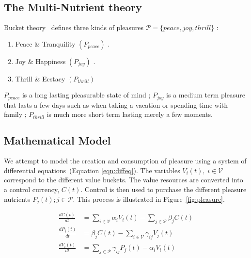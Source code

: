 \documentclass{article}
\begin{document}
\subsection{The Multi-Nutrient theory}
Bucket theory~\cite{bucket2014} defines three kinds of pleasures $ \mathcal{P} = \{peace, joy, thrill \}$ : 
\begin{enumerate}
\item Peace \& Tranquility $(P_{peace})$ .
\item Joy \& Happiness  $(P_{joy})$ .
\item Thrill \& Ecstacy $(P_{thrill})$
\end{enumerate}

$P_{peace}$ is a long lasting pleasurable state of mind ; $P_{joy}$ is a medium term pleasure that lasts a few days such as when taking a vacation or spending time with family ;  $P_{thrill}$ is much more short term lasting merely a few moments. 


\subsection{Mathematical Model}
We attempt to model the creation and consumption of pleasure using a system of differential equations~(Equation \ref{eqn:diffeq}). The variables $V_i(t),\; i\in \mathcal{V}$ correspond to the different value buckets. The value resources are converted into a control currency, $C(t)$. Control is then used to purchase the different pleasure nutrients $P_j(t) ; j\in \mathcal{P}$. This process is illustrated in Figure~\ref{fig:pleasure}.

\begin{align}\label{eqn:diffeq}
\frac{dC(t)}{dt}  &= \sum_{i \in \mathcal{V}}\alpha_i V_i(t) - \sum_{j \in \mathcal{P}}\beta_j C(t)\\
\frac{dP_j(t)}{dt}  &= \beta_j C(t) - \sum_{i \in \mathcal{V}}\gamma_{ij}V_j(t) \\
\frac{dV_i(t)}{dt}  &= \sum_{j \in \mathcal{P}}\gamma_{ij}P_j(t) - \alpha_i V_i(t)
\end{align}
\end{document}
